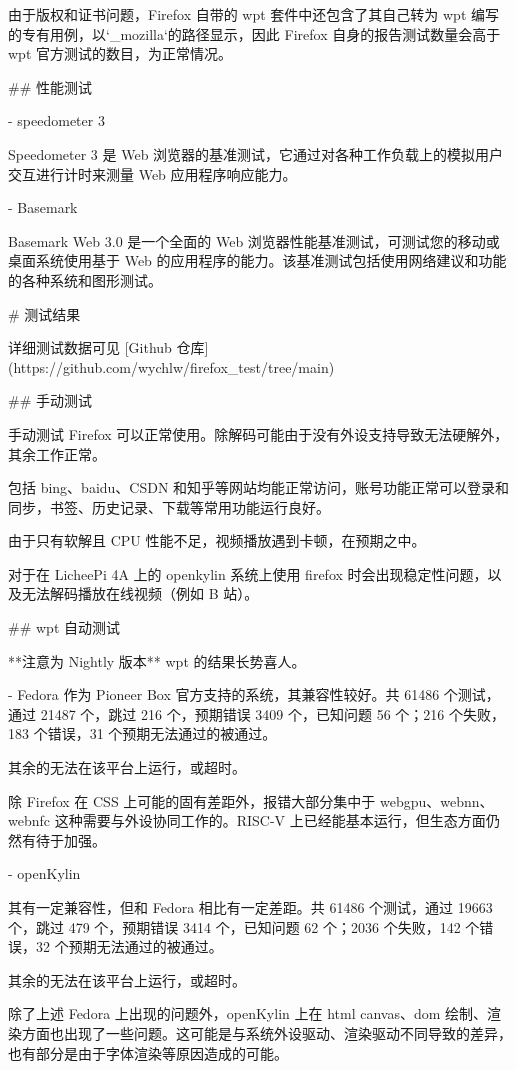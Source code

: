 \documentclass{article}
\begin{document}
\begin{markdown}
由于版权和证书问题，Firefox 自带的 wpt 套件中还包含了其自己转为 wpt 编写的专有用例，以`_mozilla`的路径显示，因此 Firefox 自身的报告测试数量会高于 wpt 官方测试的数目，为正常情况。

## 性能测试

- speedometer 3

Speedometer 3 是 Web 浏览器的基准测试，它通过对各种工作负载上的模拟用户交互进行计时来测量 Web 应用程序响应能力。

- Basemark

Basemark Web 3.0 是一个全面的 Web 浏览器性能基准测试，可测试您的移动或桌面系统使用基于 Web 的应用程序的能力。该基准测试包括使用网络建议和功能的各种系统和图形测试。

# 测试结果

详细测试数据可见 [Github 仓库](https://github.com/wychlw/firefox_test/tree/main)

## 手动测试

手动测试 Firefox 可以正常使用。除解码可能由于没有外设支持导致无法硬解外，其余工作正常。

包括 bing、baidu、CSDN 和知乎等网站均能正常访问，账号功能正常可以登录和同步，书签、历史记录、下载等常用功能运行良好。

由于只有软解且 CPU 性能不足，视频播放遇到卡顿，在预期之中。

对于在 LicheePi 4A 上的 openkylin 系统上使用 firefox 时会出现稳定性问题，以及无法解码播放在线视频（例如 B 站）。

## wpt 自动测试

**注意为 Nightly 版本**
wpt 的结果长势喜人。

- Fedora
作为 Pioneer Box 官方支持的系统，其兼容性较好。共 61486 个测试，通过 21487 个，跳过 216 个，预期错误 3409 个，已知问题 56 个；216 个失败，183 个错误，31 个预期无法通过的被通过。

其余的无法在该平台上运行，或超时。

除 Firefox 在 CSS 上可能的固有差距外，报错大部分集中于 webgpu、webnn、webnfc 这种需要与外设协同工作的。RISC-V 上已经能基本运行，但生态方面仍然有待于加强。

- openKylin

其有一定兼容性，但和 Fedora 相比有一定差距。共 61486 个测试，通过 19663 个，跳过 479 个，预期错误 3414 个，已知问题 62 个；2036 个失败，142 个错误，32 个预期无法通过的被通过。

其余的无法在该平台上运行，或超时。

除了上述 Fedora 上出现的问题外，openKylin 上在 html canvas、dom 绘制、渲染方面也出现了一些问题。这可能是与系统外设驱动、渲染驱动不同导致的差异，也有部分是由于字体渲染等原因造成的可能。


\end{markdown}
\end{document}
